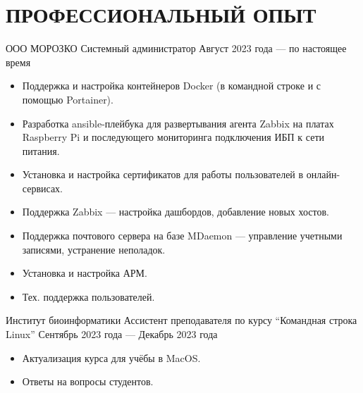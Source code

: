 \section{ПРОФЕССИОНАЛЬНЫЙ ОПЫТ}

    \job
        {ООО МОРОЗКО}
        {Системный администратор}
        {Август 2023 года --- по настоящее время}
        {
            \begin{itemize}
                \setlength\itemsep{-.5em}
                \item Поддержка и настройка контейнеров Docker (в командной строке и с помощью Portainer).
                \item Разработка ansible-плейбука для развертывания агента Zabbix на платах Raspberry Pi и последующего мониторинга подключения ИБП к сети питания.
                \item Установка и настройка сертификатов для работы пользователей в онлайн-сервисах.
                \item Поддержка Zabbix — настройка дашбордов, добавление новых хостов.
                \item Поддержка почтового сервера на базе MDaemon — управление учетными записями, устранение неполадок.
                \item Установка и настройка АРМ.
                \item Тех. поддержка пользователей.
            \end{itemize}
        }
    
    \job
        {Институт биоинформатики}
        {Ассистент преподавателя по курсу “Командная строка Linux”}
        {Сентябрь 2023 года — Декабрь 2023 года}
        {
            \begin{itemize}
                \setlength\itemsep{-.5em}
                \item Актуализация курса для учёбы в MacOS.
                \item Ответы на вопросы студентов.
            \end{itemize}
        }

